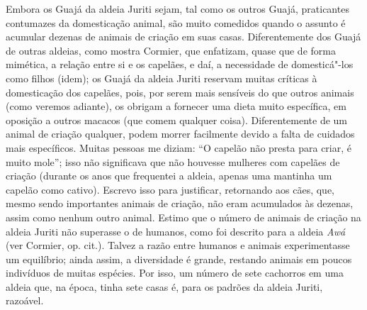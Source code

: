 Embora os Guajá da aldeia Juriti sejam, tal como os outros Guajá,
praticantes contumazes da domesticação animal, são muito comedidos
quando o assunto é acumular dezenas de animais de criação em suas casas.
Diferentemente dos Guajá de outras aldeias, como mostra Cormier, que
enfatizam, quase que de forma mimética, a relação entre si e os
capelães, e daí, a necessidade de domesticá"-los como filhos (idem); os
Guajá da aldeia Juriti reservam muitas críticas à domesticação dos
capelães, pois, por serem mais sensíveis do que outros animais (como
veremos adiante), os obrigam a fornecer uma dieta muito específica, em
oposição a outros macacos (que comem qualquer coisa). Diferentemente de
um animal de criação qualquer, podem morrer facilmente devido a falta de
cuidados mais específicos. Muitas pessoas me diziam: ``O capelão não
presta para criar, é muito mole''; isso não significava que não houvesse
mulheres com capelães de criação (durante os anos que frequentei a
aldeia, apenas uma mantinha um capelão como cativo). Escrevo isso para
justificar, retornando aos cães, que, mesmo sendo importantes animais de
criação, não eram acumulados às dezenas, assim como nenhum outro animal.
Estimo que o número de animais de criação na aldeia Juriti não superasse
o de humanos, como foi descrito para a aldeia \emph{Awá} (ver Cormier,
op. cit.). Talvez a razão entre humanos e animais experimentasse um
equilíbrio; ainda assim, a diversidade é grande, restando animais em
poucos indivíduos de muitas espécies. Por isso, um número de sete
cachorros em uma aldeia que, na época, tinha sete casas é, para os
padrões da aldeia Juriti, razoável.

